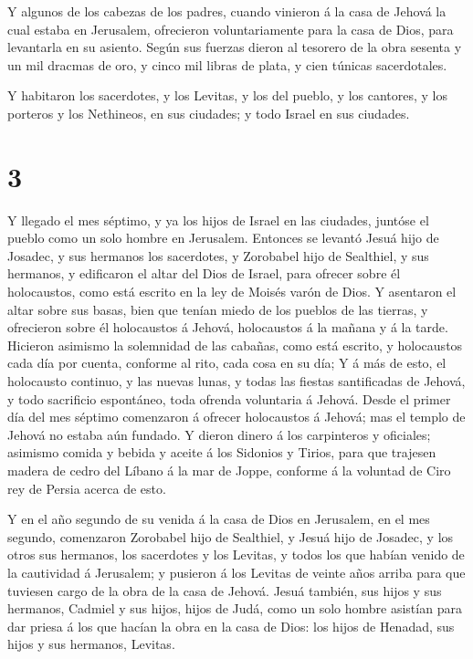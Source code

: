  Y algunos de los cabezas de los padres, cuando vinieron á
la casa de Jehová la cual estaba en Jerusalem, ofrecieron
voluntariamente para la casa de Dios, para levantarla en su asiento.
 Según sus fuerzas dieron al tesorero de la obra sesenta y
un mil dracmas de oro, y cinco mil libras de plata, y cien túnicas
sacerdotales.

 Y habitaron los sacerdotes, y los Levitas, y los del
pueblo, y los cantores, y los porteros y los Nethineos, en sus ciudades;
y todo Israel en sus ciudades.

\hypertarget{section-2}{%
\section{3}\label{section-2}}

 Y llegado el mes séptimo, y ya los hijos de Israel en las
ciudades, juntóse el pueblo como un solo hombre en Jerusalem.
 Entonces se levantó Jesuá hijo de Josadec, y sus hermanos
los sacerdotes, y Zorobabel hijo de Sealthiel, y sus hermanos, y
edificaron el altar del Dios de Israel, para ofrecer sobre él
holocaustos, como está escrito en la ley de Moisés varón de Dios.
 Y asentaron el altar sobre sus basas, bien que tenían miedo
de los pueblos de las tierras, y ofrecieron sobre él holocaustos á
Jehová, holocaustos á la mañana y á la tarde.  Hicieron
asimismo la solemnidad de las cabañas, como está escrito, y holocaustos
cada día por cuenta, conforme al rito, cada cosa en su día; 
Y á más de esto, el holocausto continuo, y las nuevas lunas, y todas las
fiestas santificadas de Jehová, y todo sacrificio espontáneo, toda
ofrenda voluntaria á Jehová.  Desde el primer día del mes
séptimo comenzaron á ofrecer holocaustos á Jehová; mas el templo de
Jehová no estaba aún fundado.  Y dieron dinero á los
carpinteros y oficiales; asimismo comida y bebida y aceite á los
Sidonios y Tirios, para que trajesen madera de cedro del Líbano á la mar
de Joppe, conforme á la voluntad de Ciro rey de Persia acerca de esto.

 Y en el año segundo de su venida á la casa de Dios en
Jerusalem, en el mes segundo, comenzaron Zorobabel hijo de Sealthiel, y
Jesuá hijo de Josadec, y los otros sus hermanos, los sacerdotes y los
Levitas, y todos los que habían venido de la cautividad á Jerusalem; y
pusieron á los Levitas de veinte años arriba para que tuviesen cargo de
la obra de la casa de Jehová.  Jesuá también, sus hijos y
sus hermanos, Cadmiel y sus hijos, hijos de Judá, como un solo hombre
asistían para dar priesa á los que hacían la obra en la casa de Dios:
los hijos de Henadad, sus hijos y sus hermanos, Levitas.

